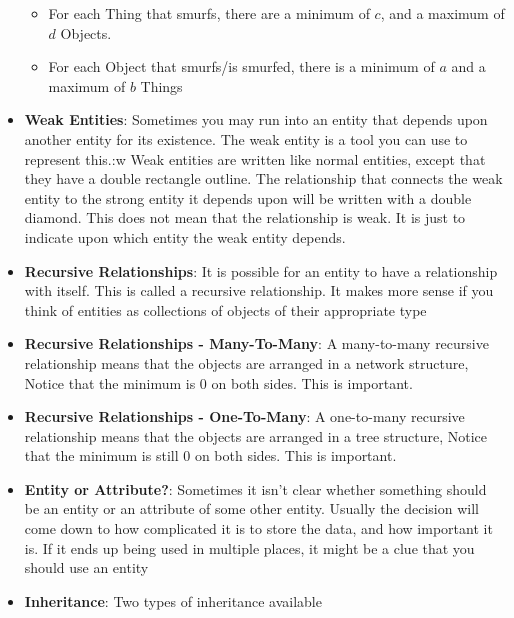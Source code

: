 \documentclass{report}
\begin{document}
\begin{itemize}
            \begin{itemize}
                \item For each Thing that smurfs, there are a minimum of $c$, and a maximum of $d$ Objects.
                \item For each Object that smurfs/is smurfed, there is a minimum of $a$ and a maximum of $b$ Things
            \end{itemize}
            \bigbreak \noindent 
        \item \textbf{Weak Entities}: Sometimes you may run into an entity that depends upon another entity for its existence. The weak entity is a tool you can use to represent this.:w
            \bigbreak \noindent 
            Weak entities are written like normal entities, except that they have a double rectangle outline. The relationship
that connects the weak entity to the strong entity it depends upon will be written with a double diamond. This
does not mean that the relationship is weak. It is just to indicate upon which entity the weak entity depends.
\bigbreak \noindent 
{}
        \item \textbf{Recursive Relationships}: It is possible for an entity to have a relationship with itself. This is called a recursive relationship. It makes more sense if you think of entities as collections of objects of their appropriate type
        \item \textbf{Recursive Relationships - Many-To-Many}: A many-to-many recursive relationship means that the objects are arranged in a network structure, Notice that the minimum is 0 on both sides. This is important.
            \bigbreak \noindent 
        \item \textbf{Recursive Relationships - One-To-Many}: A one-to-many recursive relationship means that the objects are arranged in a tree structure, Notice that the minimum is still 0 on both sides. This is important.
            \bigbreak \noindent 
        \item \textbf{Entity or Attribute?}: 
            Sometimes it isn't clear whether something should be an entity or an attribute of some other entity. Usually the
decision will come down to how complicated it is to store the data, and how important it is. If it ends up being used
in multiple places, it might be a clue that you should use an entity
        \item \textbf{Inheritance}: Two types of inheritance available

\end{itemize}
\end{document}
